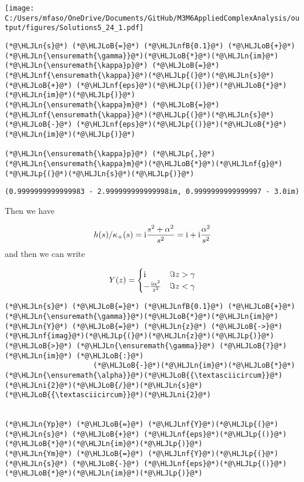 \documentclass[12pt,landscape]{article}
\newcommand{\HLJLn}[1]{#1}
\newcommand{\HLJLnf}[1]{\textcolor[RGB]{66,102,213}{#1}}
\newcommand{\HLJLnfB}[1]{\textcolor[RGB]{59,151,46}{#1}}
\newcommand{\HLJLni}[1]{\textcolor[RGB]{59,151,46}{#1}}
\newcommand{\HLJLoB}[1]{\textcolor[RGB]{102,102,102}{\textbf{#1}}}
\newcommand{\HLJLp}[1]{#1}
\def\I{ {\rm i} }
\begin{document}
{\texttt{[image: C:/Users/mfaso/OneDrive/Documents/GitHub/M3M6AppliedComplexAnalysis/output/figures/Solutions5\_24\_1.pdf]}

\begin{lstlisting}
(*@\HLJLn{s}@*) (*@\HLJLoB{=}@*) (*@\HLJLnfB{0.1}@*) (*@\HLJLoB{+}@*) (*@\HLJLn{\ensuremath{\gamma}}@*)(*@\HLJLoB{*}@*)(*@\HLJLn{im}@*)
(*@\HLJLn{\ensuremath{\kappa}p}@*) (*@\HLJLoB{=}@*) (*@\HLJLnf{\ensuremath{\kappa}}@*)(*@\HLJLp{(}@*)(*@\HLJLn{s}@*) (*@\HLJLoB{+}@*) (*@\HLJLnf{eps}@*)(*@\HLJLp{()}@*)(*@\HLJLoB{*}@*)(*@\HLJLn{im}@*)(*@\HLJLp{)}@*)
(*@\HLJLn{\ensuremath{\kappa}m}@*) (*@\HLJLoB{=}@*) (*@\HLJLnf{\ensuremath{\kappa}}@*)(*@\HLJLp{(}@*)(*@\HLJLn{s}@*) (*@\HLJLoB{-}@*) (*@\HLJLnf{eps}@*)(*@\HLJLp{()}@*)(*@\HLJLoB{*}@*)(*@\HLJLn{im}@*)(*@\HLJLp{)}@*)

(*@\HLJLn{\ensuremath{\kappa}p}@*) (*@\HLJLp{,}@*) (*@\HLJLn{\ensuremath{\kappa}m}@*)(*@\HLJLoB{*}@*)(*@\HLJLnf{g}@*)(*@\HLJLp{(}@*)(*@\HLJLn{s}@*)(*@\HLJLp{)}@*)
\end{lstlisting}

\begin{lstlisting}
(0.9999999999999983 - 2.999999999999998im, 0.9999999999999997 - 3.0im)
\end{lstlisting}


Then we have

\[
h(s)/\kappa_+(s) =  \I {s^2 + \alpha^2 \over s^2} = \I + \I {\alpha^2 \over s^2}
\]
and then we can write

\[
Y(z) = \begin{cases}
\I & \Im z > \gamma \\
-{\I \alpha^2 \over z^2} & \Im z < \gamma
\end{cases}
\]

\begin{lstlisting}
(*@\HLJLn{s}@*) (*@\HLJLoB{=}@*) (*@\HLJLnfB{0.1}@*) (*@\HLJLoB{+}@*) (*@\HLJLn{\ensuremath{\gamma}}@*)(*@\HLJLoB{*}@*)(*@\HLJLn{im}@*)
(*@\HLJLn{Y}@*) (*@\HLJLoB{=}@*) (*@\HLJLn{z}@*) (*@\HLJLoB{->}@*) (*@\HLJLnf{imag}@*)(*@\HLJLp{(}@*)(*@\HLJLn{z}@*)(*@\HLJLp{)}@*) (*@\HLJLoB{>}@*) (*@\HLJLn{\ensuremath{\gamma}}@*) (*@\HLJLoB{?}@*) (*@\HLJLn{im}@*) (*@\HLJLoB{:}@*)
                     (*@\HLJLoB{-}@*)(*@\HLJLn{im}@*)(*@\HLJLoB{*}@*)(*@\HLJLn{\ensuremath{\alpha}}@*)(*@\HLJLoB{{\textasciicircum}}@*)(*@\HLJLni{2}@*)(*@\HLJLoB{/}@*)(*@\HLJLn{s}@*)(*@\HLJLoB{{\textasciicircum}}@*)(*@\HLJLni{2}@*)


(*@\HLJLn{Yp}@*) (*@\HLJLoB{=}@*) (*@\HLJLnf{Y}@*)(*@\HLJLp{(}@*)(*@\HLJLn{s}@*) (*@\HLJLoB{+}@*) (*@\HLJLnf{eps}@*)(*@\HLJLp{()}@*)(*@\HLJLoB{*}@*)(*@\HLJLn{im}@*)(*@\HLJLp{)}@*)
(*@\HLJLn{Ym}@*) (*@\HLJLoB{=}@*) (*@\HLJLnf{Y}@*)(*@\HLJLp{(}@*)(*@\HLJLn{s}@*) (*@\HLJLoB{-}@*) (*@\HLJLnf{eps}@*)(*@\HLJLp{()}@*)(*@\HLJLoB{*}@*)(*@\HLJLn{im}@*)(*@\HLJLp{)}@*)


\end{lstlisting}}
\end{document}
